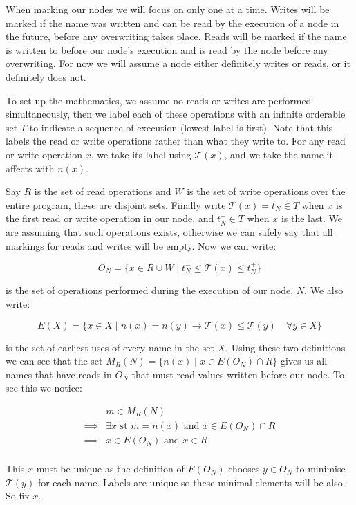 \documentclass{report}
\begin{document}
When marking our nodes we will focus on only one at a time. Writes will be marked if the name was written and can be read by the execution of a node in the
future, before any overwriting takes place. Reads will be marked if the name is written to before our node's execution and is read by the node before any
overwriting. For now we will assume a node either definitely writes or reads, or it definitely does not.

To set up the mathematics, we assume no reads or writes are performed simultaneously, then we label each of these operations with an infinite orderable set $T$ to
indicate a sequence of execution (lowest label is first). Note that this labels the read or write operations rather than what they write to. For any read or
write operation $x$, we take its label using $\mathcal{T}(x)$, and we take the name it affects with $n(x)$.

Say $R$ is the set of read operations and $W$ is the set of write operations over the entire program, these are disjoint sets. Finally write
$\mathcal{T}(x) = t^{-}_N \in T$ when $x$ is the first read or write operation in our node, and $t^{+}_N \in T$ when $x$ is the last. We are
assuming that such operations exists, otherwise we can safely say that all markings for reads and writes will be empty. Now we can write:

$$O_N = \{x \in R \cup W \mid t^{-}_N \le \mathcal{T}(x) \le t^+_N \}$$

is the set of operations performed during the execution of our node, $N$. We also write:

$$E(X) = \{x \in X \mid n(x) = n(y) \rightarrow \mathcal{T}(x) \le \mathcal{T}(y) \quad \forall y \in X \}$$

is the set of earliest uses of every name in the set $X$. Using these two definitions we can see that the set $M_R(N) = \{n(x) \mid x \in E(O_N) \cap R \}$ gives us
all names that have reads in $O_N$ that must read values written before our node. To see this we notice:

\begin{align*}
         & m \in M_R(N) \\
\implies & \exists x \text{ st } m = n(x) \text{ and } x \in E(O_N) \cap R \\
\implies & x \in  E(O_N) \text{ and } x \in R \\
\end{align*}

This $x$ must be unique as the definition of $E(O_N)$ chooses $y \in O_N$ to minimise $\mathcal{T}(y)$ for each name. Labels are unique so these minimal elements
will be also. So fix $x$.
\end{document}
